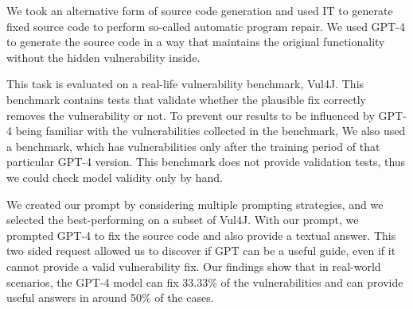 We took an alternative form of source code generation and used IT to generate fixed source code to perform so-called automatic program repair.
We used GPT-4 to generate the source code in a way that maintains the original functionality without the hidden vulnerability inside.

This task is evaluated on a real-life vulnerability benchmark, Vul4J.
This benchmark contains tests that validate whether the plausible fix correctly removes the vulnerability or not.
To prevent our results to be influenced by GPT-4 being familiar with the vulnerabilities collected in the benchmark, We also used a benchmark, which has vulnerabilities only after the training period of that particular GPT-4 version.
This benchmark does not provide validation tests, thus we could check model validity only by hand.

We created our prompt by considering multiple prompting strategies, and we selected the best-performing on a subset of Vul4J.
With our prompt, we prompted GPT-4 to fix the source code and also provide a textual answer.
This two sided request allowed us to discover if GPT can be a useful guide, even if it cannot provide a valid vulnerability fix.
Our findings show that in real-world scenarios, the GPT-4 model can fix 33.33\% of the vulnerabilities  and can provide useful answers in around 50\% of the cases.
